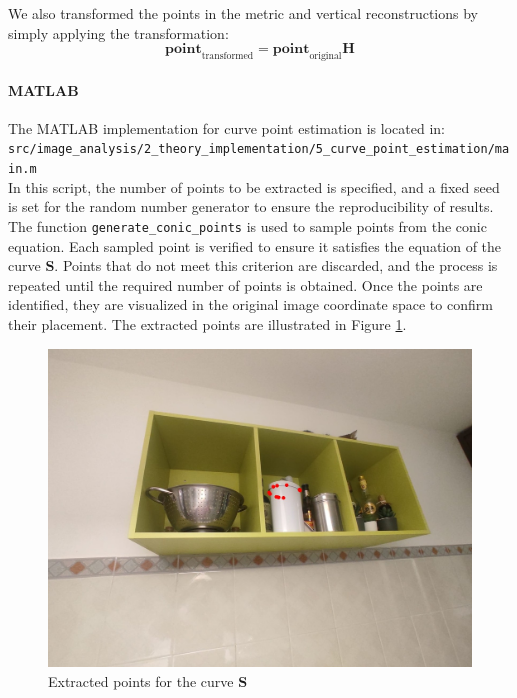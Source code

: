 \documentclass{Academic}
\begin{document}
We also transformed the points in the metric and vertical reconstructions by simply applying the transformation: 
\begin{equation}
    \mathbf{point}_{\text{transformed}} = \mathbf{point}_{\text{original}}\mathbf{H}
\end{equation}

\paragraph*{MATLAB}
The MATLAB implementation for curve point estimation is located in: \\ 
\texttt{src/image\_analysis/2\_theory\_implementation/5\_curve\_point\_estimation/main.m} \\
In this script, the number of points to be extracted is specified, and a fixed seed is set for the random number generator to ensure the reproducibility of results. 
The function \texttt{generate\_conic\_points} is used to sample points from the conic equation. 
Each sampled point is verified to ensure it satisfies the equation of the curve $\mathbf{S}$. 
Points that do not meet this criterion are discarded, and the process is repeated until the required number of points is obtained. 
Once the points are identified, they are visualized in the original image coordinate space to confirm their placement. 
The extracted points are illustrated in Figure \ref{fig:curve_points}.
\begin{figure}[!htb]%
    \centering
    \includegraphics[width=0.5\linewidth]{images/curve_points.jpg}
    \caption{Extracted points for the curve $\mathbf{S}$}
    \label{fig:curve_points}
\end{figure}
\end{document}
